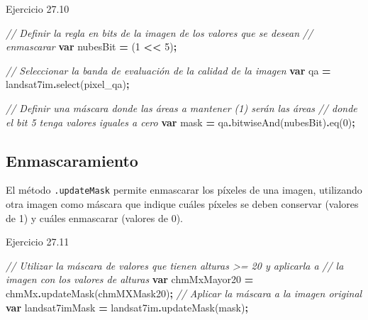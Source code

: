 \documentclass[
  12pt,
  letterpaper,
  twoside]{book}
\newenvironment{Shaded}{\begin{snugshade}}{\end{snugshade}}
\newcommand{\CommentTok}[1]{\textcolor[rgb]{0.56,0.35,0.01}{\textit{#1}}}
\newcommand{\DecValTok}[1]{\textcolor[rgb]{0.00,0.00,0.81}{#1}}
\newcommand{\FunctionTok}[1]{\textcolor[rgb]{0.00,0.00,0.00}{#1}}
\newcommand{\KeywordTok}[1]{\textcolor[rgb]{0.13,0.29,0.53}{\textbf{#1}}}
\newcommand{\NormalTok}[1]{#1}
\newcommand{\OperatorTok}[1]{\textcolor[rgb]{0.81,0.36,0.00}{\textbf{#1}}}
\newcommand{\StringTok}[1]{\textcolor[rgb]{0.31,0.60,0.02}{#1}}
\begin{document}
Ejercicio 27.10

\begin{Shaded}
\begin{Highlighting}[]
\CommentTok{// Definir la regla en bits de la imagen de los valores que se desean }
\CommentTok{// enmascarar}
\KeywordTok{var}\NormalTok{ nubesBit }\OperatorTok{=}\NormalTok{ (}\DecValTok{1} \OperatorTok{\textless{}\textless{}} \DecValTok{5}\NormalTok{)}\OperatorTok{;}

\CommentTok{// Seleccionar la banda de evaluación de la calidad de la imagen}
\KeywordTok{var}\NormalTok{ qa }\OperatorTok{=}\NormalTok{ landsat7im}\OperatorTok{.}\FunctionTok{select}\NormalTok{(}\StringTok{\textquotesingle{}pixel\_qa\textquotesingle{}}\NormalTok{)}\OperatorTok{;}

\CommentTok{// Definir una máscara donde las áreas a mantener (1) serán las áreas }
\CommentTok{// donde el bit 5 tenga valores iguales a cero}
\KeywordTok{var}\NormalTok{ mask }\OperatorTok{=}\NormalTok{ qa}\OperatorTok{.}\FunctionTok{bitwiseAnd}\NormalTok{(nubesBit)}\OperatorTok{.}\FunctionTok{eq}\NormalTok{(}\DecValTok{0}\NormalTok{)}\OperatorTok{;}
\end{Highlighting}
\end{Shaded}

\hypertarget{enmascaramiento}{%
\subsection*{Enmascaramiento}\label{enmascaramiento}}

El método \texttt{.updateMask} permite enmascarar los píxeles de una imagen, utilizando otra imagen como máscara que indique cuáles píxeles se deben conservar (valores de 1) y cuáles enmascarar (valores de 0).

Ejercicio 27.11

\begin{Shaded}
\begin{Highlighting}[]
\CommentTok{// Utilizar la máscara de valores que tienen alturas \textgreater{}= 20 y aplicarla a }
\CommentTok{// la imagen con los valores de alturas}
\KeywordTok{var}\NormalTok{ chmMxMayor20 }\OperatorTok{=}\NormalTok{ chmMx}\OperatorTok{.}\FunctionTok{updateMask}\NormalTok{(chmMXMask20)}\OperatorTok{;}
\CommentTok{// Aplicar la máscara a la imagen original}
\KeywordTok{var}\NormalTok{ landsat7imMask }\OperatorTok{=}\NormalTok{ landsat7im}\OperatorTok{.}\FunctionTok{updateMask}\NormalTok{(mask)}\OperatorTok{;}
\end{Highlighting}
\end{Shaded}
\end{document}
